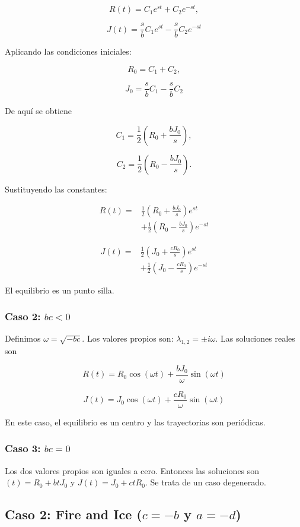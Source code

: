 \documentclass[10pt]{article}
\numberwithin{equation}{section}
\begin{document}
\[
R(t)=C_1e^{st}+C_2e^{-st},
\]

\[
J(t)=\frac{s}{b}C_1e^{st}
-\frac{s}{b}C_2e^{-st}
\]

Aplicando las condiciones iniciales:

\[
R_0=C_1+C_2,
\]

\[
J_0=\frac{s}{b}C_1-\frac{s}{b}C_2
\]

De aquí se obtiene

\[
C_1=\frac12\left(R_0+\frac{bJ_0}{s}\right),
\]

\[
C_2=\frac12\left(R_0-\frac{bJ_0}{s}\right).
\]

Sustituyendo las constantes:

\[
\boxed{
\begin{aligned}
R(t)={}&
\frac12\left(R_0+\frac{bJ_0}{s}\right)e^{st}\\
&+
\frac12\left(R_0-\frac{bJ_0}{s}\right)e^{-st}
\end{aligned}
}
\]

\[
\boxed{
\begin{aligned}
J(t)={}&
\frac12\left(J_0+\frac{cR_0}{s}\right)e^{st}\\
&+
\frac12\left(J_0-\frac{cR_0}{s}\right)e^{-st}
\end{aligned}
}
\]

El equilibrio es un punto silla.

\subsubsection{Caso 2: $bc<0$}

Definimos $\omega=\sqrt{-bc}$. Los valores propios son: $\lambda_{1,2}=\pm i\omega$. Las soluciones reales son

\[
\boxed{
R(t)=R_0\cos(\omega t)
+\frac{bJ_0}{\omega}\sin(\omega t)
}
\]

\[
\boxed{
J(t)=J_0\cos(\omega t)
+\frac{cR_0}{\omega}\sin(\omega t)
}
\]

En este caso, el equilibrio es un centro y las trayectorias son periódicas.

\subsubsection{Caso 3: $bc=0$}

Los dos valores propios son iguales a cero. Entonces las soluciones son $(t)=R_0+btJ_0$ y $J(t)=J_0+ctR_0$.
Se trata de un caso degenerado.

\subsection{Caso 2: Fire and Ice ($c = -b$ y $a = -d$)}
\end{document}
